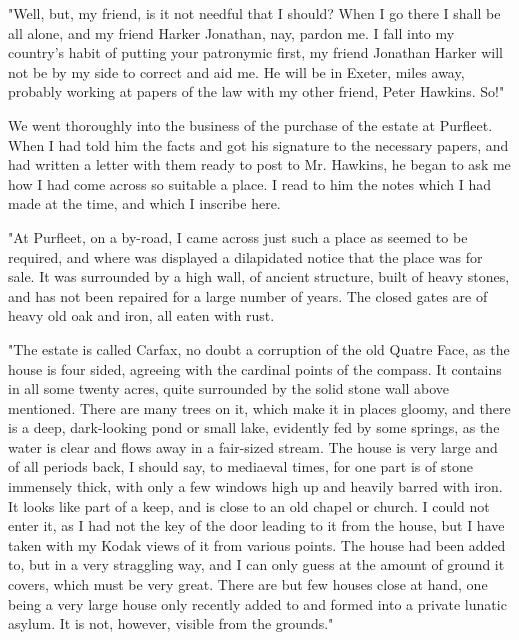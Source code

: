 "Well, but, my friend, is it not needful that I should? When I go there I shall be all alone, and my friend Harker Jonathan, nay, pardon me. I fall into my country's habit of putting your patronymic first, my friend Jonathan Harker will not be by my side to correct and aid me. He will be in Exeter, miles away, probably working at papers of the law with my other friend, Peter Hawkins. So!" 

We went thoroughly into the business of the purchase of the estate at Purfleet. When I had told him the facts and got his signature to the necessary papers, and had written a letter with them ready to post to Mr. Hawkins, he began to ask me how I had come across so suitable a place. I read to him the notes which I had made at the time, and which I inscribe here. 

"At Purfleet, on a by-road, I came across just such a place as seemed to be required, and where was displayed a dilapidated notice that the place was for sale. It was surrounded by a high wall, of ancient structure, built of heavy stones, and has not been repaired for a large number of years. The closed gates are of heavy old oak and iron, all eaten with rust. 

"The estate is called Carfax, no doubt a corruption of the old Quatre Face, as the house is four sided, agreeing with the cardinal points of the compass. It contains in all some twenty acres, quite surrounded by the solid stone wall above mentioned. There are many trees on it, which make it in places gloomy, and there is a deep, dark-looking pond or small lake, evidently fed by some springs, as the water is clear and flows away in a fair-sized stream. The house is very large and of all periods back, I should say, to mediaeval times, for one part is of stone immensely thick, with only a few windows high up and heavily barred with iron. It looks like part of a keep, and is close to an old chapel or church. I could not enter it, as I had not the key of the door leading to it from the house, but I have taken with my Kodak views of it from various points. The house had been added to, but in a very straggling way, and I can only guess at the amount of ground it covers, which must be very great. There are but few houses close at hand, one being a very large house only recently added to and formed into a private lunatic asylum. It is not, however, visible from the grounds." 

